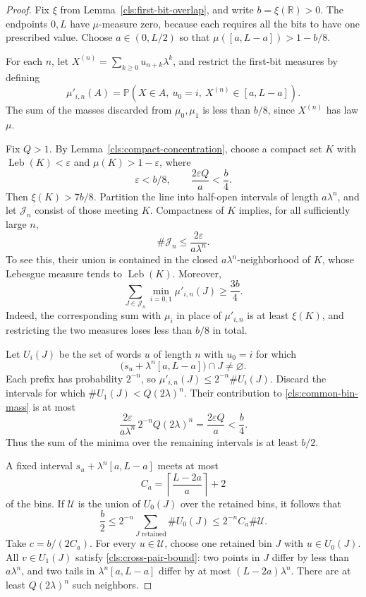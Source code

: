 \begin{proof}
Fix $\xi$ from Lemma~\ref{cls:first-bit-overlap}, and write
$b=\xi(\mathbb R)>0$.  The endpoints $0,L$ have $\mu$-measure zero,
because each requires all the bits to have one prescribed value.
Choose $a\in(0,L/2)$ so that
$\mu([a,L-a])>1-b/8$.

For each $n$, let
$X^{(n)}=\sum_{k\geq0}u_{n+k}\lambda^k$, and restrict the first-bit
measures by defining
\[
  \mu'_{i,n}(A)=
  \mathbb P(X\in A,\ u_0=i,\ X^{(n)}\in[a,L-a]).
\]
The sum of the masses discarded from $\mu_0,\mu_1$ is less than
$b/8$, since $X^{(n)}$ has law $\mu$.

Fix $Q>1$.  By Lemma~\ref{cls:compact-concentration}, choose a compact
set $K$ with $\operatorname{Leb}(K)<\varepsilon$ and
$\mu(K)>1-\varepsilon$, where
\[
  \varepsilon<b/8,
  \qquad \frac{2\varepsilon Q}{a}<\frac b4.
\]
Then $\xi(K)>7b/8$.  Partition the line into half-open intervals of
length $a\lambda^n$, and let $\mathcal J_n$ consist of those meeting
$K$.  Compactness of $K$ implies, for all sufficiently large $n$,
\[
  \#\mathcal J_n\leq\frac{2\varepsilon}{a\lambda^n}.
\]
To see this, their union is contained in the closed
$a\lambda^n$-neighborhood of $K$, whose Lebesgue measure tends to
$\operatorname{Leb}(K)$.  Moreover,
\begin{equation}
  \sum_{J\in\mathcal J_n}
       \min_{i=0,1}\mu'_{i,n}(J)\geq\frac{3b}{4}.
  \label{cls:common-bin-mass}
\end{equation}
Indeed, the corresponding sum with $\mu_i$ in place of $\mu'_{i,n}$
is at least $\xi(K)$, and restricting the two measures loses less
than $b/8$ in total.

Let $U_i(J)$ be the set of words $u$ of length $n$ with $u_0=i$ for
which
\[
  \bigl(s_u+\lambda^n[a,L-a]\bigr)\cap J\ne\varnothing.
\]
Each prefix has probability $2^{-n}$, so
$\mu'_{i,n}(J)\leq2^{-n}\#U_i(J)$.  Discard the intervals for which
$\#U_1(J)<Q(2\lambda)^n$.  Their contribution to
\eqref{cls:common-bin-mass} is at most
\[
  \frac{2\varepsilon}{a\lambda^n}\,
  2^{-n}Q(2\lambda)^n
  =\frac{2\varepsilon Q}{a}<\frac b4.
\]
Thus the sum of the minima over the remaining intervals is at least
$b/2$.

A fixed interval $s_u+\lambda^n[a,L-a]$ meets at most
\[
  C_a=\left\lceil\frac{L-2a}{a}\right\rceil+2
\]
of the bins.  If $\mathcal U$ is the union of $U_0(J)$ over the retained
bins, it follows that
\[
  \frac b2\leq2^{-n}\sum_{J\text{ retained}}\#U_0(J)
       \leq2^{-n}C_a\#\mathcal U.
\]
Take $c=b/(2C_a)$.  For every $u\in\mathcal U$, choose one retained
bin $J$ with $u\in U_0(J)$.  All $v\in U_1(J)$ satisfy
\eqref{cls:cross-pair-bound}: two points in $J$ differ by less than
$a\lambda^n$, and two tails in $\lambda^n[a,L-a]$ differ by at most
$(L-2a)\lambda^n$.  There are at least $Q(2\lambda)^n$ such neighbors.
\end{proof}

